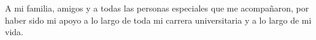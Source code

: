 \begin{dedication}
	A mi familia, amigos y a todas las personas especiales que me acompañaron, por haber sido mi
	apoyo a lo largo de toda mi carrera universitaria y a lo largo de mi vida.
\end{dedication}
